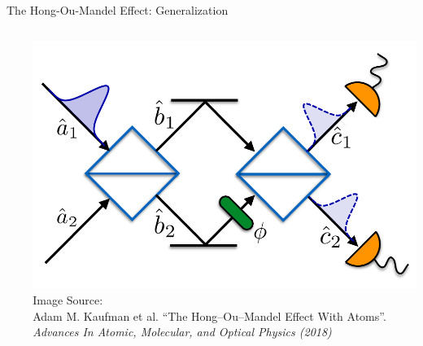 \begin{frame}[t]{The Hong-Ou-Mandel Effect: Generalization}
\begin{columns}
\begin{itemize}
\begin{align*}
	\end{align*}
\end{itemize}
%
%
	\includegraphics[width=\linewidth]{./gfx/HOM-Phaseshift}
	{\scriptsize
		Image Source:\\
		Adam M. Kaufman et al. \enquote{The Hong–Ou–Mandel Effect With Atoms}.
		\emph{Advances In Atomic, Molecular, and Optical Physics (2018)}
	}
\end{columns}
%
\end{frame}


